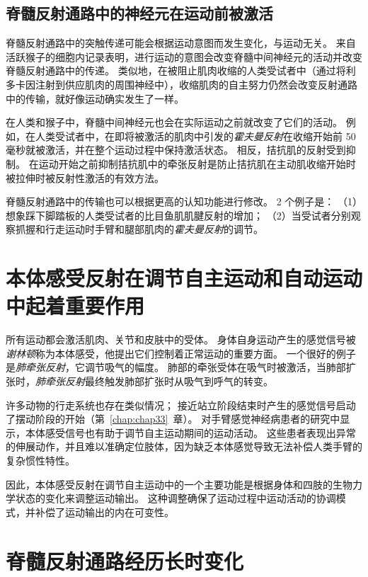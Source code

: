 \subsection{脊髓反射通路中的神经元在运动前被激活}

脊髓反射通路中的突触传递可能会根据运动意图而发生变化，与运动无关。
来自活跃猴子的细胞内记录表明，进行运动的意图会改变脊髓中间神经元的活动并改变脊髓反射通路中的传递。
类似地，在被阻止肌肉收缩的人类受试者中（通过将利多卡因注射到供应肌肉的周围神经中），收缩肌肉的自主努力仍然会改变反射通路中的传输，就好像运动确实发生了一样。


在人类和猴子中，脊髓中间神经元也会在实际运动之前就改变了它们的活动。
例如，在人类受试者中，在即将被激活的肌肉中引发的\textit{霍夫曼反射}在收缩开始前 50 毫秒就被激活，并在整个运动过程中保持激活状态。
相反，拮抗肌的反射受到抑制。
在运动开始之前抑制拮抗肌中的牵张反射是防止拮抗肌在主动肌收缩开始时被拉伸时被反射性激活的有效方法。


脊髓反射通路中的传输也可以根据更高的认知功能进行修改。
2 个例子是：
（1）想象踩下脚踏板的人类受试者的比目鱼肌肌腱反射的增加；
（2）当受试者分别观察抓握和行走运动时手臂和腿部肌肉的\textit{霍夫曼反射}的调节。



\section{本体感受反射在调节自主运动和自动运动中起着重要作用}

所有运动都会激活肌肉、关节和皮肤中的受体。
身体自身运动产生的感觉信号被\textit{谢林顿}称为本体感受，他提出它们控制着正常运动的重要方面。
一个很好的例子是\textit{肺牵张反射}，它调节吸气的幅度。
肺部的牵张受体在吸气时被激活，当肺部扩张时，\textit{肺牵张反射}最终触发肺部扩张时从吸气到呼气的转变。


许多动物的行走系统也存在类似情况；
接近站立阶段结束时产生的感觉信号启动了摆动阶段的开始（第~\ref{chap:chap33}~章）。
对手臂感觉神经病患者的研究中显示，本体感受信号也有助于调节自主运动期间的运动活动。
这些患者表现出异常的伸展动作，并且难以准确定位肢体，因为缺乏本体感觉导致无法补偿人类手臂的复杂惯性特性。


因此，本体感受反射在调节自主运动中的一个主要功能是根据身体和四肢的生物力学状态的变化来调整运动输出。
这种调整确保了运动过程中运动活动的协调模式，并补偿了运动输出的内在可变性。



\section{脊髓反射通路经历长时变化}

